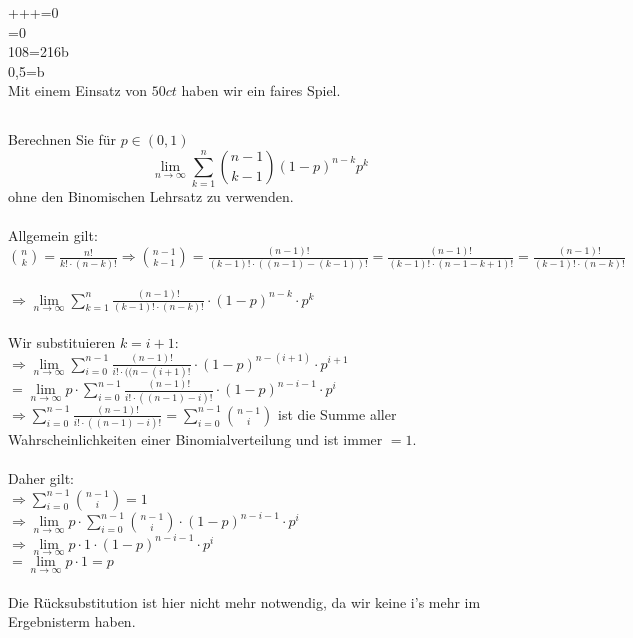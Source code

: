 \documentclass[a4paper]{article}
\begin{document}
+++=0 \\
=0\\
108=216b\\
0,5=b\\\)
Mit einem Einsatz von $50ct$ haben wir ein faires Spiel.
\clearpage
\noindent\subsection{}
Berechnen Sie für $p\in(0,1)$
\[\lim\limits_{n\to\infty}\sum\limits^n_{k=1}\binom{n-1}{k-1}(1-p)^{n-k}p^k\]
ohne den Binomischen Lehrsatz zu verwenden.\\\\
Allgemein gilt: $\binom{n}{k} = \frac{n!}{k! \cdot (n-k)!} \Rightarrow \binom{n - 1}{k - 1} = \frac{(n-1)!}{(k-1)!\cdot ((n-1)-(k-1))!}=\frac{(n-1)!}{(k-1)!\cdot(n-1-k+1)!}=\frac{(n - 1)!}{(k - 1)! \cdot (n - k)!}$\\\\
$\Rightarrow \lim\limits_{n \to \infty} \sum\limits_{k = 1}^{n} \frac{(n - 1)!}{(k - 1)! \cdot (n - k)!} \cdot (1 - p)^{n - k} \cdot p^k$\\\\
Wir substituieren $k = i + 1$:\\
$\Rightarrow \lim\limits_{n \to \infty} \sum\limits_{i = 0}^{n - 1} \frac{(n - 1)!}{i! \cdot ((n - (i + 1)!} \cdot (1 - p)^{n - (i + 1)} \cdot p^{i + 1}$\\
$= \lim\limits_{n \to \infty} p \cdot \sum\limits_{i = 0}^{n - 1} \frac{(n - 1)!}{i! \cdot ((n - 1) - i)!} \cdot (1 - p)^{n - i - 1} \cdot p^i$\\
$\Rightarrow \sum\limits^{n-1}_{i=0}\frac{(n-1)!}{i!\cdot((n-1)-i)!}=\sum\limits_{i = 0}^{n - 1} \binom{n - 1}{i}$ ist die Summe aller Wahrscheinlichkeiten einer Binomialverteilung und ist immer $= 1$.\\\\
Daher gilt:\\
$\Rightarrow \sum\limits_{i = 0}^{n - 1} \binom{n - 1}{i} = 1$\\
$\Rightarrow \lim\limits_{n \to \infty} p \cdot \sum\limits_{i = 0}^{n - 1} \binom{n - 1}{i} \cdot (1 - p)^{n - i - 1} \cdot p^i$\\
$\Rightarrow \lim\limits_{n\to\infty} p \cdot 1 \cdot (1 - p)^{n - i - 1} \cdot p^i$\\
$= \lim\limits_{n \to \infty} p \cdot 1 = p$\\\\
Die Rücksubstitution ist hier nicht mehr notwendig, da wir keine i's mehr im Ergebnisterm haben.
\end{document}
